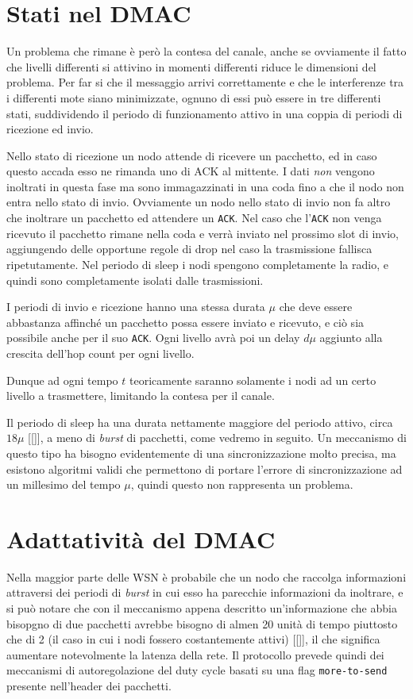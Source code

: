 \documentclass[pdftex,11pt,a4paper,italian]{book}
\begin{document}
\section{Stati nel DMAC}
Un problema che rimane è però la contesa del canale, anche se ovviamente il fatto che livelli 
differenti si attivino in momenti differenti riduce le dimensioni del problema.
Per far si che il messaggio arrivi correttamente e che le interferenze tra i differenti 
mote siano minimizzate, ognuno di essi può essere in tre differenti stati, suddividendo il 
periodo di funzionamento attivo in una coppia di periodi di ricezione ed invio. 

Nello stato di ricezione un nodo attende di ricevere un pacchetto, ed in caso questo accada 
esso ne rimanda uno di ACK al mittente. I dati \emph{non} vengono inoltrati in questa fase ma 
sono immagazzinati in una coda fino a che il nodo non entra nello stato di invio.
Ovviamente un nodo nello stato di invio non fa altro che inoltrare un pacchetto ed attendere un 
\texttt{ACK}. Nel caso che l'\texttt{ACK}  non venga ricevuto il pacchetto rimane nella coda e 
verrà inviato nel prossimo slot di invio, aggiungendo delle opportune regole di drop nel caso 
la trasmissione fallisca ripetutamente. 
Nel periodo di sleep i nodi spengono completamente la radio, e quindi sono completamente isolati dalle trasmissioni. 

I periodi di invio e ricezione hanno una stessa durata $\mu$ che deve essere abbastanza affinché 
un pacchetto possa essere inviato e ricevuto, e ciò sia possibile anche per il suo \texttt{ACK}.
Ogni livello avrà poi un delay $d\mu$ aggiunto alla crescita dell'hop count per ogni livello. 
 
Dunque ad ogni tempo $t$ teoricamente saranno solamente i nodi ad un certo livello a 
trasmettere, limitando la contesa per il canale. 

Il periodo di sleep ha una durata nettamente maggiore del periodo attivo, circa $18\mu$ [[]], a meno di \emph{burst} di pacchetti, come vedremo in seguito.
Un meccanismo di questo tipo ha bisogno evidentemente di una sincronizzazione molto precisa, ma 
esistono algoritmi validi che permettono di portare l'errore di sincronizzazione ad un millesimo 
del tempo $\mu$, quindi questo non rappresenta un problema. 

\section{Adattatività del DMAC}
Nella maggior parte delle WSN è probabile che un nodo che raccolga informazioni attraversi dei
periodi di \emph{burst} in cui esso ha parecchie informazioni da inoltrare, e si può notare che 
con il meccanismo appena descritto un'informazione che abbia bisopgno di due pacchetti avrebbe 
bisogno di almen 20 unità di tempo piuttosto che di 2 (il caso in cui i nodi fossero 
costantemente attivi) [[]], il che significa aumentare notevolmente la latenza della rete. 
Il protocollo prevede quindi dei meccanismi di autoregolazione del duty cycle basati su una flag 
\texttt{more-to-send} presente nell'header dei pacchetti.
\end{document}
